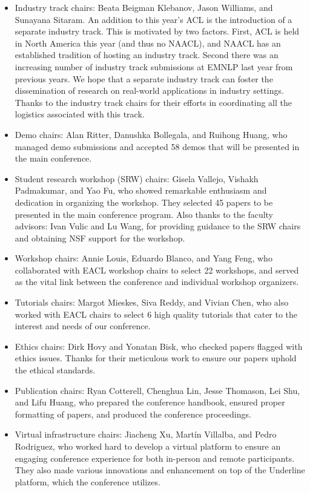 \begin{itemize}
\item Industry track chairs: Beata Beigman Klebanov, Jason Williams, and Sunayana Sitaram. An addition to this year's ACL is the introduction of a separate industry track. This is motivated by two factors. First, ACL is held in North America this year (and thus no NAACL), and NAACL has an established tradition of hosting an industry track. Second there was an increasing number of industry track submissions at EMNLP last year from previous years. We hope that a separate industry track can foster the dissemination of research on real-world applications in industry settings. Thanks to the industry track chairs for their efforts in coordinating all the logistics associated with this track.
\item Demo chairs: Alan Ritter, Danushka Bollegala, and Ruihong Huang, who managed demo submissions and accepted 58 demos that will be presented in the main conference.
\item Student research workshop (SRW) chairs: Gisela Vallejo, Vishakh Padmakumar, and Yao Fu, who showed remarkable enthusiasm and dedication in organizing the workshop. They selected 45 papers to be presented in the main conference program. Also thanks to the faculty advisors: Ivan Vulic and Lu Wang, for providing guidance to the SRW chairs and obtaining NSF support for the workshop. 
\item Workshop chairs: Annie Louis, Eduardo Blanco, and Yang Feng, who collaborated with EACL workshop chairs to select 22 workshops, and served as the vital link between the conference and individual workshop organizers.
\item Tutorials chairs: Margot Mieskes, Siva Reddy, and Vivian Chen, who also worked with EACL chairs to select 6 high quality tutorials that cater to the interest and needs of our conference.
\item Ethics chairs: Dirk Hovy and Yonatan Bisk, who checked papers flagged with ethics issues. Thanks for their meticulous work to ensure our papers uphold the ethical standards.
\item Publication chairs: Ryan Cotterell, Chenghua Lin, Jesse Thomason, Lei Shu, and Lifu Huang, who prepared the conference handbook, ensured proper formatting of papers, and produced the conference proceedings.
\item Virtual infrastructure chairs: Jiacheng Xu, Martín Villalba, and Pedro Rodriguez, who worked hard to develop a virtual platform to ensure an engaging conference experience for both in-person and remote participants. They also made various innovations and enhancement on top of the Underline platform, which the conference utilizes. %

\end{itemize}
